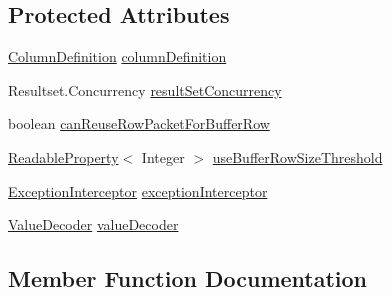 \subsection*{Protected Attributes}
\begin{DoxyCompactItemize}
\item 
\mbox{\hyperlink{interfacecom_1_1mysql_1_1cj_1_1protocol_1_1_column_definition}{Column\+Definition}} \mbox{\hyperlink{classcom_1_1mysql_1_1cj_1_1protocol_1_1a_1_1_abstract_row_factory_a7aef40ef79169af177fd41fe37bc4dec}{column\+Definition}}
\item 
Resultset.\+Concurrency \mbox{\hyperlink{classcom_1_1mysql_1_1cj_1_1protocol_1_1a_1_1_abstract_row_factory_ac68967cbb94b27d270217cdd4dec3203}{result\+Set\+Concurrency}}
\item 
boolean \mbox{\hyperlink{classcom_1_1mysql_1_1cj_1_1protocol_1_1a_1_1_abstract_row_factory_adc5a27f2f54c423393f1f118e6bc7d4f}{can\+Reuse\+Row\+Packet\+For\+Buffer\+Row}}
\item 
\mbox{\hyperlink{interfacecom_1_1mysql_1_1cj_1_1conf_1_1_readable_property}{Readable\+Property}}$<$ Integer $>$ \mbox{\hyperlink{classcom_1_1mysql_1_1cj_1_1protocol_1_1a_1_1_abstract_row_factory_a1a04c7a5096d1d61dc2a58e50dbf3f33}{use\+Buffer\+Row\+Size\+Threshold}}
\item 
\mbox{\hyperlink{interfacecom_1_1mysql_1_1cj_1_1exceptions_1_1_exception_interceptor}{Exception\+Interceptor}} \mbox{\hyperlink{classcom_1_1mysql_1_1cj_1_1protocol_1_1a_1_1_abstract_row_factory_ae5096f00f7c263d6bb5fcd2a710e82ad}{exception\+Interceptor}}
\item 
\mbox{\hyperlink{interfacecom_1_1mysql_1_1cj_1_1protocol_1_1_value_decoder}{Value\+Decoder}} \mbox{\hyperlink{classcom_1_1mysql_1_1cj_1_1protocol_1_1a_1_1_abstract_row_factory_a7eaae01dda1379db83fbf4076eab67df}{value\+Decoder}}
\end{DoxyCompactItemize}


\subsection{Member Function Documentation}
\mbox{\label{classcom_1_1mysql_1_1cj_1_1protocol_1_1a_1_1_abstract_row_factory_a4692c57d253b16f586b8c201c6109ab0}} 
